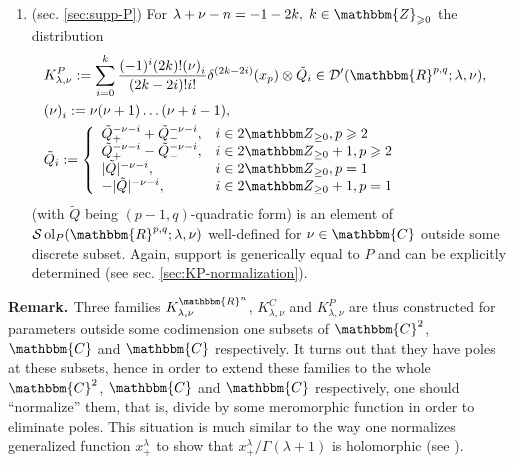 \documentclass{article}
\newcommand{\assign}{:=}
\newcommand{\tmop}[1]{\ensuremath{\operatorname{#1}}}
\newcommand{\tmtextbf}[1]{{\bfseries{#1}}}
\numberwithin{definition}{section}
\numberwithin{lemma}{section}
\numberwithin{proposition}{section}
{\theorembodyfont{\rmfamily}\newtheorem{remark}{Remark}
\numberwithin{remark}{section}
}
\begin{document}
{\begin{enumerate}
  \item (sec. \ref{sec:supp-P}) For $\lambda + \nu - n = - 1 - 2 k, \; k \in
  \mathbbm{Z}_{\geqslant 0}$ the distribution
  \begin{eqnarray}
    & K^P_{\lambda, \nu} \assign \sum_{i = 0}^k \frac{(- 1)^i (2 k) !
    (\nu)^{}_i}{(2 k - 2 i) !i!} \delta^{(2 k - 2 i)} (x_p) \otimes
    \tilde{Q}_i \in \mathcal{D}' ( \mathbbm{R}^{p, q} ; \lambda, \nu), & 
    \nonumber\\
    & (\nu)^{}_i \assign \nu (\nu + 1) \ldots (\nu + i - 1), &  \nonumber\\
    & \tilde{Q}_i \assign \left\{ \begin{array}{ll}
      \tilde{Q}_+^{- \nu - i} + \tilde{Q}_-^{- \nu - i}, & i \in 2 \Z_{\ge 0},
      p \geqslant 2\\
      \tilde{Q}_+^{- \nu - i} - \tilde{Q}_-^{- \nu - i}, & i \in 2 \Z_{\ge 0}
      + 1, p \geqslant 2\\
      | \tilde{Q} |^{- \nu - i}, & i \in 2 \Z_{\ge 0}, p = 1\\
      - | \tilde{Q} |^{- \nu - i}, & i \in 2 \Z_{\ge 0} + 1, p = 1
    \end{array} \right. &  \nonumber
  \end{eqnarray}
  (with $\tilde{Q}$ being $( p - 1, q)$-quadratic form) is an element of
  $\mathcal{S} \tmop{ol}_P ( \mathbbm{R}^{p, q} ; \lambda, \nu)$ well-defined
  for $\nu \in \mathbbm{C}$ outside some discrete subset. Again, support is
  generically equal to $P$ and can be explicitly determined (see sec.
  \ref{sec:KP-normalization}).
\end{enumerate}}{\hspace*{\fill}}{\medskip}

{\noindent}\tmtextbf{Remark. }Three families $K_{\lambda,
\nu}^{\mathbbm{R}^n}$, $K_{\lambda, \nu}^C$ and $K_{\lambda, \nu}^P$ are thus
constructed for parameters outside some codimension one subsets of
$\mathbbm{C}^2$, $\mathbbm{C}$ and $\mathbbm{C}$ respectively. It turns out
that they have poles at these subsets, hence in order to extend these families
to the whole $\mathbbm{C}^2$, $\mathbbm{C}$ and $\mathbbm{C}$ respectively,
one should ``normalize'' them, that is, divide by some meromorphic function in
order to eliminate poles. This situation is much similar to the way one
normalizes generalized function $x_+^{\lambda}$ to show that $x_+^{\lambda} /
\Gamma ( \lambda + 1)$ is holomorphic (see {\cite[sec.
1.3.5]{gelfand1980distribution}}).{\hspace*{\fill}}{\medskip}
\end{document}
